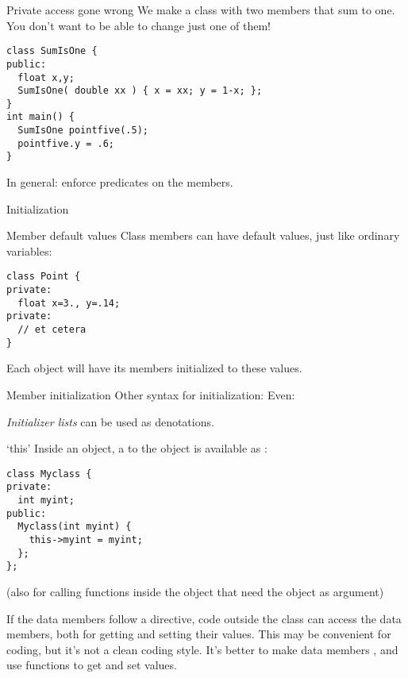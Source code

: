 \begin{block}{Private access gone wrong}
  \label{sl:privatenogood}
  We make a class with two members that sum to one.\\
  You don't want to be able to change just one of them!
\begin{verbatim}
class SumIsOne {
public: 
  float x,y;
  SumIsOne( double xx ) { x = xx; y = 1-x; };
}
int main() {
  SumIsOne pointfive(.5);
  pointfive.y = .6;
}
\end{verbatim}
In general: enforce predicates on the members.
\end{block}

 {Initialization}

\begin{block}{Member default values}
  \label{sl:class-defval}
  Class members can have default values, just like ordinary variables:
\begin{verbatim}
class Point {
private:
  float x=3., y=.14;
private:
  // et cetera
}
\end{verbatim}
  Each object will have its members initialized to these values.
\end{block}

\begin{block}{Member initialization}
  \label{sl:class-init}
  Other syntax for initialization:
  Even:

  \emph{Initializer lists} can be used as denotations.
\end{block}

\begin{block}{`this'}
  \label{sl:class-this}
  Inside an object, a  to the object is available
  as :
\begin{verbatim}
class Myclass {
private:
  int myint;
public:
  Myclass(int myint) {
    this->myint = myint;
  };
};
\end{verbatim}
(also for calling functions inside the object that need the object as argument)
\end{block}

If the data members follow a  directive, code
outside the class can access the data members, both for getting and
setting their values. This may be convenient for coding, but it's not
a clean coding style. It's better to make data members
, and use  functions to get
and set values.

